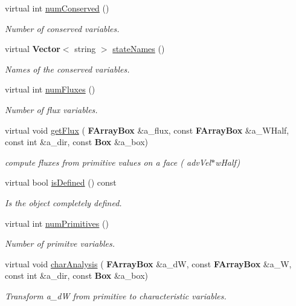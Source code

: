 \begin{DoxyCompactItemize}
virtual int \hyperlink{class_advection_physics_ab139a3b1201a76e97e918381c5b3ff98}{num\+Conserved} ()
\begin{DoxyCompactList}\small\item\em Number of conserved variables. \end{DoxyCompactList}\item 
virtual \textbf{ Vector}$<$ string $>$ \hyperlink{class_advection_physics_a992f0d9ca9515de44b82981c14a2fb31}{state\+Names} ()
\begin{DoxyCompactList}\small\item\em Names of the conserved variables. \end{DoxyCompactList}\item 
virtual int \hyperlink{class_advection_physics_ab59b268a446dbe2912e000c11870ab2f}{num\+Fluxes} ()
\begin{DoxyCompactList}\small\item\em Number of flux variables. \end{DoxyCompactList}\item 
virtual void \hyperlink{class_advection_physics_a469e6262703804372173e378c37b735f}{get\+Flux} (\textbf{ F\+Array\+Box} \&a\+\_\+flux, const \textbf{ F\+Array\+Box} \&a\+\_\+\+W\+Half, const int \&a\+\_\+dir, const \textbf{ Box} \&a\+\_\+box)
\begin{DoxyCompactList}\small\item\em compute fluxes from primitive values on a face ( adv\+Vel$\ast$w\+Half) \end{DoxyCompactList}\item 
virtual bool \hyperlink{class_advection_physics_a92b160c02d12974644e65dce3b7945b9}{is\+Defined} () const
\begin{DoxyCompactList}\small\item\em Is the object completely defined. \end{DoxyCompactList}\item 
virtual int \hyperlink{class_advection_physics_ad00c2d52ec684668ff5cd1da9eed42bf}{num\+Primitives} ()
\begin{DoxyCompactList}\small\item\em Number of primitve variables. \end{DoxyCompactList}\item 
virtual void \hyperlink{class_advection_physics_a63895f9dd1173d14684c0681653c8d36}{char\+Analysis} (\textbf{ F\+Array\+Box} \&a\+\_\+dW, const \textbf{ F\+Array\+Box} \&a\+\_\+W, const int \&a\+\_\+dir, const \textbf{ Box} \&a\+\_\+box)
\begin{DoxyCompactList}\small\item\em Transform a\+\_\+dW from primitive to characteristic variables. \end{DoxyCompactList}\item 

\end{DoxyCompactItemize}
